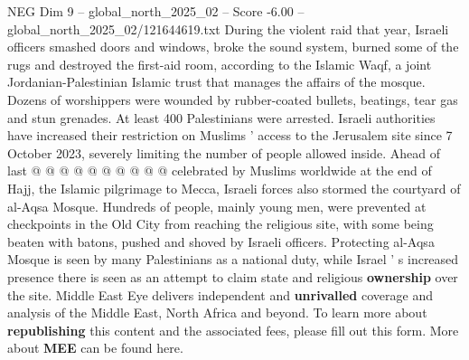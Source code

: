 \begin{textsample}{NEG Dim 9 – global\_north\_2025\_02 – Score -6.00 – global\_north\_2025\_02/121644619.txt}
During the violent raid that year, Israeli officers smashed doors and windows, broke the sound system, burned some of the rugs and destroyed the first-aid room, according to the Islamic Waqf, a joint Jordanian-Palestinian Islamic trust that manages the affairs of the mosque.
Dozens of worshippers were wounded by rubber-coated bullets, beatings, tear gas and stun grenades.
At least 400 Palestinians were arrested.
Israeli authorities have increased their restriction on Muslims ' access to the Jerusalem site since 7 October 2023, severely limiting the number of people allowed inside.
Ahead of last @ @ @ @ @ @ @ @ @ @ celebrated by Muslims worldwide at the end of Hajj, the Islamic pilgrimage to Mecca, Israeli forces also stormed the courtyard of al-Aqsa Mosque.
Hundreds of people, mainly young men, were prevented at checkpoints in the Old City from reaching the religious site, with some being beaten with batons, pushed and shoved by Israeli officers.
Protecting al-Aqsa Mosque is seen by many Palestinians as a national duty, while Israel ' s increased presence there is seen as an attempt to claim state and religious \textbf{ownership} over the site.
Middle East Eye delivers independent and \textbf{unrivalled} coverage and analysis of the Middle East, North Africa and beyond.
To learn more about \textbf{republishing} this content and the associated fees, please fill out this form.
More about \textbf{MEE} can be found here.

\end{textsample}
